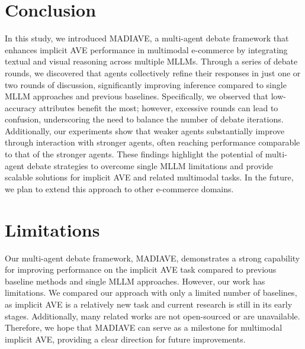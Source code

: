 \documentclass[11pt]{article}
\newcommand{\modelname}{MADIAVE}
\begin{document}
\vspace{-0.5em}

\section{Conclusion}

In this study, we introduced \textsc{\modelname}, a multi-agent debate framework that enhances implicit AVE performance in multimodal e-commerce by integrating textual and visual reasoning across multiple MLLMs. Through a series of debate rounds, we discovered that agents collectively refine their responses in just one or two rounds of discussion, significantly improving inference compared to single MLLM approaches and previous baselines. Specifically, we observed that low-accuracy attributes benefit the most; however, excessive rounds can lead to confusion, underscoring the need to balance the number of debate iterations. Additionally, our experiments show that weaker agents substantially improve through interaction with stronger agents, often reaching performance comparable to that of the stronger agents. These findings highlight the potential of multi-agent debate strategies to overcome single MLLM limitations and provide scalable solutions for implicit AVE and related multimodal tasks. In the future, we plan to extend this approach to other e-commerce domains.


\newpage
\section{Limitations}

Our multi-agent debate framework, \textsc{\modelname}, demonstrates a strong capability for improving performance on the implicit AVE task compared to previous baseline methods and single MLLM approaches. However, our work has limitations. We compared our approach with only a limited number of baselines, as implicit AVE is a relatively new task and current research is still in its early stages. Additionally, many related works are not open-sourced or are unavailable. Therefore, we hope that \textsc{\modelname} can serve as a milestone for multimodal implicit AVE, providing a clear direction for future improvements.

\end{document}
